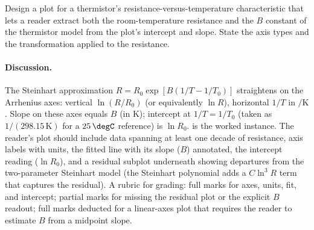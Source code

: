 \begin{exercise}
Design a plot for a thermistor's resistance-versus-temperature
characteristic that lets a reader extract both the room-temperature
resistance and the $B$ constant of the thermistor model from the
plot's intercept and slope. State the axis types and the
transformation applied to the resistance.

\paragraph{Discussion.}
The Steinhart approximation $R = R_{0} \exp[B(1/T - 1/T_{0})]$
straightens on the Arrhenius axes: vertical $\ln(R/R_{0})$ (or
equivalently $\ln R$), horizontal $1/T$ in $\si{\per\kelvin}$.
Slope on these axes equals $B$ (in $\si{\kelvin}$); intercept at
$1/T = 1/T_{0}$ (taken as $1/(298.15\,\si{\kelvin})$ for a
$25\,\degC$ reference) is $\ln R_{0}$.  is the worked instance. The reader's plot should
include data spanning at least one decade of resistance, axis
labels with units, the fitted line with its slope ($B$) annotated,
the intercept reading ($\ln R_{0}$), and a residual subplot
underneath showing departures from the two-parameter Steinhart
model (the Steinhart polynomial adds a $C \ln^{3} R$ term that
captures the residual). A rubric for grading: full marks for axes,
units, fit, and intercept; partial marks for missing the residual
plot or the explicit $B$ readout; full marks deducted for a
linear-axes plot that requires the reader to estimate $B$ from a
midpoint slope.
\end{exercise}

